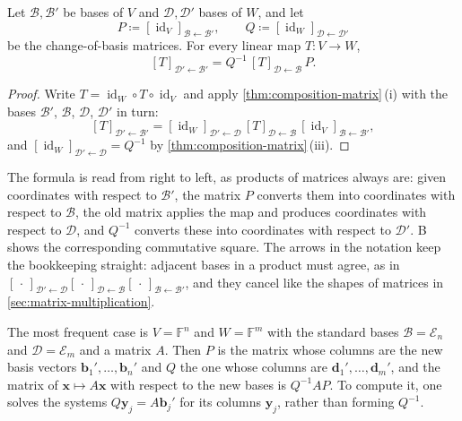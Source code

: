\begin{theorem}
\label{thm:change-of-basis-map}
Let $\mathcal B,\mathcal B'$ be bases of $V$ and $\mathcal D,\mathcal D'$ bases of $W$, and let
\[
P\coloneqq[\operatorname{id}_V]_{\mathcal B\leftarrow\mathcal B'},\qquad Q\coloneqq[\operatorname{id}_W]_{\mathcal D\leftarrow\mathcal D'}
\]
be the change-of-basis matrices. For every linear map $T\colon V\to W$,
\[
[T]_{\mathcal D'\leftarrow\mathcal B'}=Q^{-1}\,[T]_{\mathcal D\leftarrow\mathcal B}\,P .
\]
\end{theorem}

\begin{proof}
Write $T=\operatorname{id}_W\circ T\circ\operatorname{id}_V$ and apply \cref{thm:composition-matrix}\,(i) with the bases $\mathcal B'$, $\mathcal B$, $\mathcal D$, $\mathcal D'$ in turn:
\[
[T]_{\mathcal D'\leftarrow\mathcal B'}=[\operatorname{id}_W]_{\mathcal D'\leftarrow\mathcal D}\,[T]_{\mathcal D\leftarrow\mathcal B}\,[\operatorname{id}_V]_{\mathcal B\leftarrow\mathcal B'},
\]
and $[\operatorname{id}_W]_{\mathcal D'\leftarrow\mathcal D}=Q^{-1}$ by \cref{thm:composition-matrix}\,(iii).
\end{proof}

The formula is read from right to left, as products of matrices always are: given coordinates with respect to $\mathcal B'$, the matrix $P$ converts them into coordinates with respect to $\mathcal B$, the old matrix applies the map and produces coordinates with respect to $\mathcal D$, and $Q^{-1}$ converts these into coordinates with respect to $\mathcal D'$. B shows the corresponding commutative square. The arrows in the notation keep the bookkeeping straight: adjacent bases in a product must agree, as in $[\,\cdot\,]_{\mathcal D'\leftarrow\mathcal D}[\,\cdot\,]_{\mathcal D\leftarrow\mathcal B}[\,\cdot\,]_{\mathcal B\leftarrow\mathcal B'}$, and they cancel like the shapes of matrices in \cref{sec:matrix-multiplication}.

The most frequent case is $V=\mathbb F^n$ and $W=\mathbb F^m$ with the standard bases $\mathcal B=\mathcal E_n$ and $\mathcal D=\mathcal E_m$ and a matrix $A$. Then $P$ is the matrix whose columns are the new basis vectors $\mathbf b_1',\ldots,\mathbf b_n'$ and $Q$ the one whose columns are $\mathbf d_1',\ldots,\mathbf d_m'$, and the matrix of $\mathbf x\mapsto A\mathbf x$ with respect to the new bases is $Q^{-1}AP$. To compute it, one solves the systems $Q\mathbf y_j=A\mathbf b_j'$ for its columns $\mathbf y_j$, rather than forming $Q^{-1}$.

